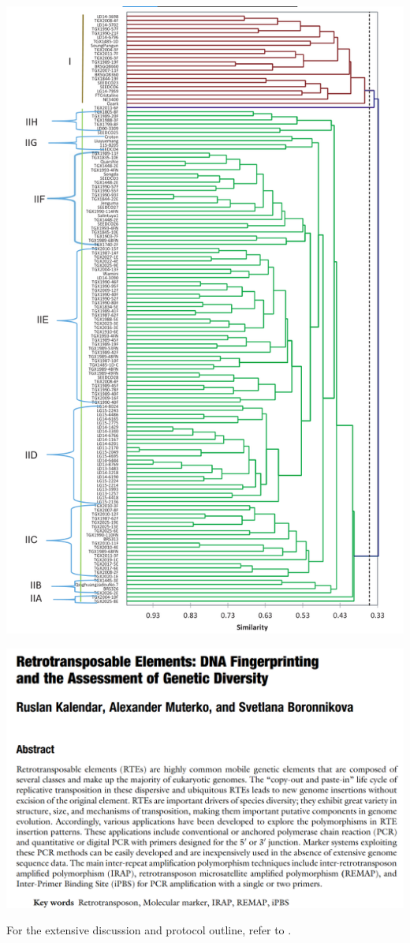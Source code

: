 \documentclass[
  ignorenonframetext,
  aspectratio=169]{beamer}
\begin{document}
\begin{frame}{}
\protect\hypertarget{section-3}{}
\begin{center}\includegraphics[width=0.4\linewidth]{../images/Ghana_soybean_upgma_clustering} \end{center}
\end{frame}

\begin{frame}{}
\protect\hypertarget{section-4}{}
\begin{center}\includegraphics[width=0.76\linewidth]{../images/Transposon_fingerprinting_genetic_diversity_assess} \end{center}

For the extensive discussion and protocol outline, refer to
\citet{kalendar2021retrotransposable}.
\end{frame}
\end{document}
